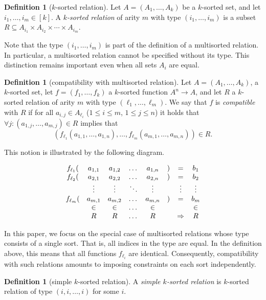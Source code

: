 \documentclass{amsart}
\numberwithin{equation}{section}
\theoremstyle{plain}
\theoremstyle{definition}
\newtheorem{definition}[theorem]{Definition}
\def\set#1{#1}
\def\relation#1{#1}
\begin{document}
\begin{definition}[$k$-sorted relation]
Let $\set{A}=(\set{A}_1,\dots,\set{A}_k)$ be a $k$-sorted set, and let $i_1,\dots, i_m \in [k]$. A {\em $k$-sorted relation} of arity $m$ with type $(i_1,\dots, i_m )$ is a subset $\relation{R}\subseteq \set{A}_{i_1}\times \set{A}_{i_2}\times\cdots\times \set{A}_{i_m}$.
\end{definition}

Note that the type $(i_1,\dots,i_m)$ is part of the definition of a multisorted relation. In particular, a multisorted relation cannot be specified without its type. This distinction remains important even when all sets $\set{A}_i$ are equal.

\begin{definition}[compatibility with multisorted relation]
Let $\set{A}=(\set{A}_1,\dots,\set{A}_k)$, a $k$-sorted set, let $f=(f_1,\dots,f_k)$ a $k$-sorted function $\set{A}^n\to \set{A}$, and let $\relation{R}$ a $k$-sorted relation of arity $m$ with type $(\ell_1,\dots, \ell_m)$. We say that $f$ is {\em compatible} with $\relation{R}$ if for all $a_{i,j} \in \set{A}_{\ell_i}$ ($1\leq i\leq m$, $1\leq j\leq n$) it holds that $\forall j\colon (a_{1,j},\dots,a_{m,j})\in \relation{R}$ implies that
$$(f_{\ell_1} (a_{1,1},\dots,a_{1,n}),\dots,f_{\ell_m}(a_{m,1},\dots,a_{m,n}))\in \relation{R}.$$
\end{definition}

This notion is illustrated by the following diagram.

$$\begin{matrix}
f_{\ell_1}(& a_{1,1} & a_{1,2} & \dots & a_{1,n} & ) & = & b_1 \cr
f_{\ell_2}(& a_{2,1} & a_{2,2} & \dots & a_{2,n} & ) & = & b_2 \cr
& \vdots & \vdots & \ddots & \vdots &  & \vdots & \vdots \cr
f_{\ell_m}(& a_{m,1} & a_{m,2} & \dots & a_{m,n} & ) & = & b_m \cr
& \in & \in & \dots & \in &  &  & \in \cr
& R & R & \dots & R &  & \Rightarrow & R \cr
\end{matrix}$$

In this paper, we focus on the special case of multisorted relations whose type consists of a single sort. That is, all indices in the type are equal. In the definition above, this means that all functions $f_{\ell_i}$ are identical. Consequently, compatibility with such relations amounts to imposing constraints on each sort independently.

\begin{definition}[simple $k$-sorted relation]
A {\em simple $k$-sorted relation} is $k$-sorted relation of type $(i,i,\dots,i)$ for some $i$.
\end{definition}
\end{document}
